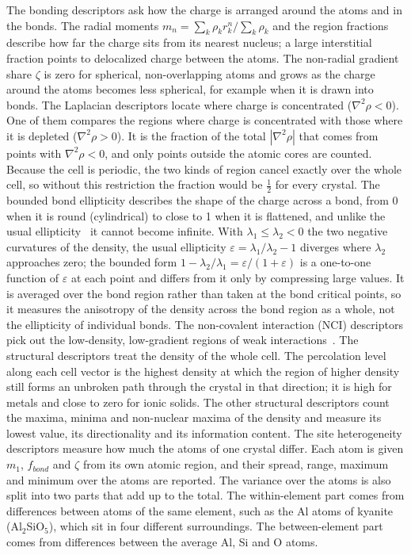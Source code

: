 \documentclass[journal=jctcce,manuscript=article,email=true]{achemso}
\newcommand{\rev}[1]{{\color{blue}#1}}
\begin{document}
The bonding descriptors ask how the charge is arranged around the atoms and in
the bonds. The radial moments $m_n=\sum_k\rho_k r_k^n/\sum_k\rho_k$ and the \rev{region}
fractions describe how far the charge sits from its nearest nucleus; a large
interstitial fraction points to delocalized charge between the atoms. The
non-radial gradient share $\zeta$ is zero for spherical, non-overlapping atoms
and grows as the charge around the atoms becomes less spherical, for example
when it is drawn into bonds.
The Laplacian descriptors locate where charge is concentrated
($\nabla^2\rho<0$). One of them compares the regions where charge is
concentrated with those where it is depleted ($\nabla^2\rho>0$). It is the
fraction of the total $|\nabla^2\rho|$ that comes from points with
$\nabla^2\rho<0$, and only points outside the atomic cores are counted.
Because the cell is periodic, the two kinds of region cancel exactly over the
whole cell, so without this restriction the fraction would be $\tfrac12$ for
every crystal. The bounded bond ellipticity describes the shape of the charge across
a bond, from 0 when it is round (cylindrical) to close to 1 when it is
flattened, and unlike the usual ellipticity\rev{~\cite{bader1983}} it cannot become infinite.
\rev{With $\lambda_1\le\lambda_2<0$ the two negative curvatures of the density, the usual
ellipticity $\varepsilon=\lambda_1/\lambda_2-1$ diverges where $\lambda_2$ approaches zero;
the bounded form $1-\lambda_2/\lambda_1=\varepsilon/(1+\varepsilon)$ is a one-to-one function
of $\varepsilon$ at each point and differs from it only by compressing large values. It is
averaged over the bond region rather than taken at the bond critical points, so it measures
the anisotropy of the density across the bond region as a whole, not the ellipticity of
individual bonds.} The
non-covalent interaction (NCI) descriptors pick out the low-density,
low-gradient regions of weak interactions~\cite{johnson2010}. The structural
descriptors treat the density of the whole cell. The percolation level along
each cell vector is the highest density at which the region of higher density
still forms an unbroken path through the crystal in that direction; it is high
for metals and close to zero for ionic solids. The other structural
descriptors count the maxima, minima and non-nuclear maxima of the density and
measure its lowest value, its directionality and its information content. The
site heterogeneity descriptors measure how much the atoms of one crystal
differ. Each atom is given $m_1$, $f_{bond}$ and $\zeta$ from its own atomic
region, and their spread, range, maximum and minimum over the atoms are
reported. The variance over the
atoms is also split into two parts that add up to the total. The
within-element part comes from differences between atoms of the same element,
such as the Al atoms of kyanite (Al$_2$SiO$_5$), which sit in four different
surroundings. The between-element part comes from differences between the
average Al, Si and O atoms.
\end{document}
